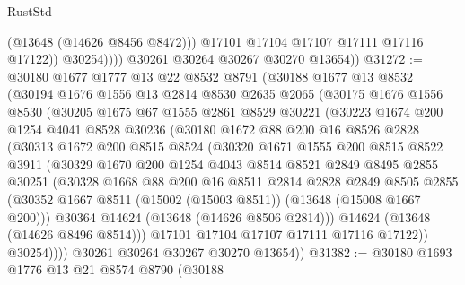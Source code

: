 \begin{lexlean}{RustStd}
\begin{coremodule}
                      (@13648 (@14626 @8456 @8472)))
                    @17101
                    @17104
                    @17107
                    @17111
                    @17116
                    @17122))
                @30254))))
        @30261
        @30264
        @30267
        @30270
        @13654))
@31272 := @30180
    @1677
    @1777
    @13
    @22
    @8532
    @8791
    (@30188
      @1677
      @13
      @8532
      (@30194
        @1676
        @1556
        @13
        @2814
        @8530
        @2635
        @2065
        (@30175
          @1676
          @1556
          @8530
          (@30205
            @1675
            @67
            @1555
            @2861
            @8529
            @30221
            (@30223
              @1674
              @200
              @1254
              @4041
              @8528
              @30236
              (@30180
                @1672
                @88
                @200
                @16
                @8526
                @2828
                (@30313
                  @1672
                  @200
                  @8515
                  @8524
                  (@30320
                    @1671
                    @1555
                    @200
                    @8515
                    @8522
                    @3911
                    (@30329
                      @1670
                      @200
                      @1254
                      @4043
                      @8514
                      @8521
                      @2849
                      @8495
                      @2855
                      @30251
                      (@30328
                        @1668
                        @88
                        @200
                        @16
                        @8511
                        @2814
                        @2828
                        @2849
                        @8505
                        @2855
                        (@30352 @1667 @8511 (@15002 (@15003 @8511)) (@13648 (@15008 @1667 @200)))
                        @30364
                        @14624
                        (@13648 (@14626 @8506 @2814)))
                      @14624
                      (@13648 (@14626 @8496 @8514)))
                    @17101
                    @17104
                    @17107
                    @17111
                    @17116
                    @17122))
                @30254))))
        @30261
        @30264
        @30267
        @30270
        @13654))
@31382 := @30180
    @1693
    @1776
    @13
    @21
    @8574
    @8790
    (@30188

\end{coremodule}
\end{lexlean}
